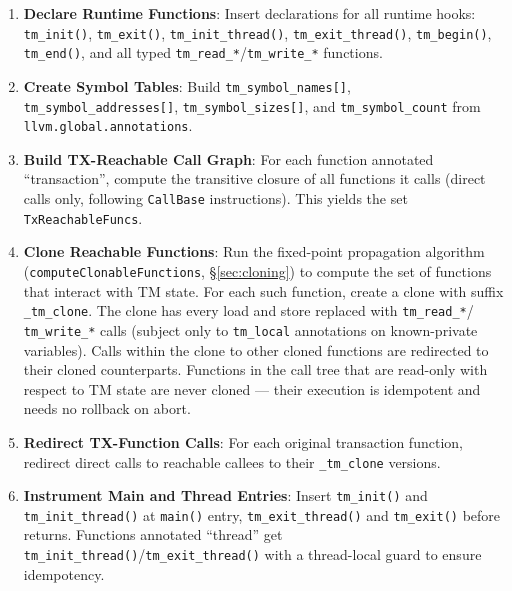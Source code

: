\documentclass[article,12pt]{article}
\begin{document}
\begin{enumerate}
\item \textbf{Declare Runtime Functions}: Insert declarations for all runtime hooks:
  \texttt{tm\_init()}, \texttt{tm\_exit()}, \texttt{tm\_init\_thread()},
  \texttt{tm\_exit\_thread()}, \texttt{tm\_begin()}, \texttt{tm\_end()}, and
  all typed \texttt{tm\_read\_*}/\texttt{tm\_write\_*} functions.

\item \textbf{Create Symbol Tables}: Build \texttt{tm\_symbol\_names[]},
  \texttt{tm\_symbol\_addresses[]}, \texttt{tm\_symbol\_sizes[]}, and
  \texttt{tm\_symbol\_count} from \texttt{llvm.global.annotations}.

\item \textbf{Build TX-Reachable Call Graph}: For each function annotated
  ``transaction'', compute the transitive closure of all functions it calls
  (direct calls only, following \texttt{CallBase} instructions).  This yields
  the set \texttt{TxReachableFuncs}.

\item \textbf{Clone Reachable Functions}: Run the fixed-point propagation
  algorithm (\texttt{computeClonableFunctions}, \S\ref{sec:cloning}) to compute
  the set of functions that interact with TM state.  For each such function,
  create a clone with suffix \texttt{\_tm\_clone}.  The clone has every load and
  store replaced with \texttt{tm\_read\_*}/
  \texttt{tm\_write\_*} calls (subject only to \texttt{tm\_local}
  annotations on known-private variables).  Calls within the clone to other cloned functions
  are redirected to their cloned counterparts.  Functions in the call tree that
  are read-only with respect to TM state are never cloned --- their execution is
  idempotent and needs no rollback on abort.

\item \textbf{Redirect TX-Function Calls}: For each original transaction function,
  redirect direct calls to reachable callees to their \texttt{\_tm\_clone} versions.

\item \textbf{Instrument Main and Thread Entries}: Insert \texttt{tm\_init()}
  and \texttt{tm\_init\_thread()} at \texttt{main()} entry, \texttt{tm\_exit\_thread()}
  and \texttt{tm\_exit()} before returns.  Functions annotated ``thread'' get
  \texttt{tm\_init\_thread()}/\texttt{tm\_exit\_thread()} with a thread-local
  guard to ensure idempotency.
\end{enumerate}
\end{document}
